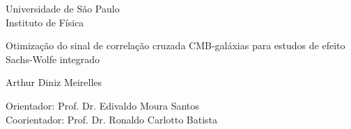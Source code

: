\begin{titlepage}
\pagestyle{empty}
\begin{center}

	{\fontsize{16}{16} \selectfont Universidade de São Paulo \\}
	\vspace{0.1cm}
	{\fontsize{16}{16} \selectfont Instituto de Física}
    \vspace{3.3cm}

	{\fontsize{22}{22}\selectfont Otimização do sinal de correlação cruzada CMB-galáxias para estudos de efeito Sachs-Wolfe integrado \par}
    \vspace{2cm}


    {\fontsize{18}{18}\selectfont Arthur Diniz Meirelles \par}

    \vspace{2cm}

\end{center}

\leftskip 6cm
\begin{flushright}	
\leftskip 6cm
Orientador: Prof. Dr.  Edivaldo Moura Santos \\
\leftskip 6cm
Coorientador: Prof. Dr. Ronaldo Carlotto Batista
\end{flushright}	

    \vspace{0.8cm}    


\par
\leftskip 6cm
\par
\leftskip 0cm
\vskip 2cm


\end{titlepage}
